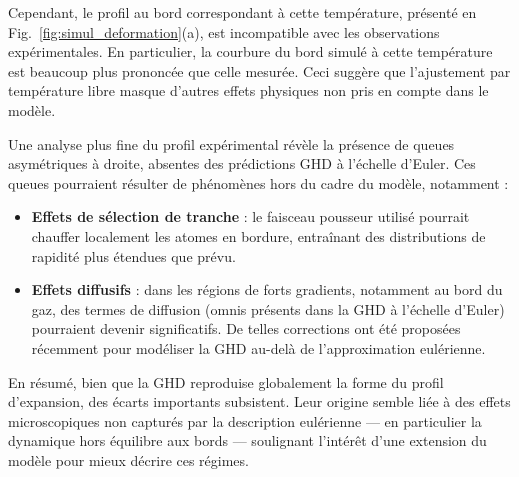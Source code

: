 Cependant, le profil au bord correspondant à cette température, présenté en Fig.~\ref{fig:simul_deformation}(a), est incompatible avec les observations expérimentales. En particulier, la courbure du bord simulé à cette température est beaucoup plus prononcée que celle mesurée. Ceci suggère que l’ajustement par température libre masque d'autres effets physiques non pris en compte dans le modèle.

\medskip

Une analyse plus fine du profil expérimental révèle la présence de queues asymétriques à droite, absentes des prédictions GHD à l’échelle d’Euler. Ces queues pourraient résulter de phénomènes hors du cadre du modèle, notamment :

\begin{itemize}
\item \textbf{Effets de sélection de tranche} : le faisceau pousseur utilisé pourrait chauffer localement les atomes en bordure, entraînant des distributions de rapidité plus étendues que prévu.
\item \textbf{Effets diffusifs} : dans les régions de forts gradients, notamment au bord du gaz, des termes de diffusion (omnis présents dans la GHD à l’échelle d’Euler) pourraient devenir significatifs. De telles corrections ont été proposées récemment pour modéliser la GHD au-delà de l’approximation eulérienne.
\end{itemize}

\medskip

En résumé, bien que la GHD reproduise globalement la forme du profil d’expansion, des écarts importants subsistent. Leur origine semble liée à des effets microscopiques non capturés par la description eulérienne — en particulier la dynamique hors équilibre aux bords — soulignant l’intérêt d’une extension du modèle pour mieux décrire ces régimes.


